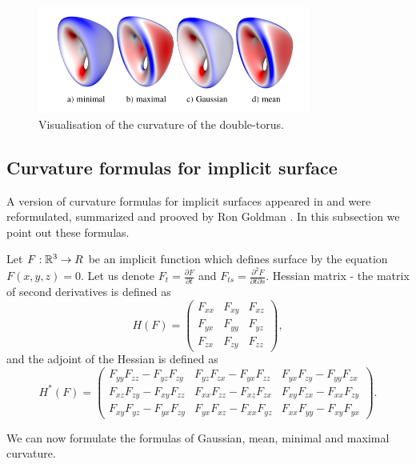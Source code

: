 \begin{figure}
    \centerline{\includegraphics[width=0.8\textwidth]{images/img16}}
    \caption[Visualisation of the curvature of the double-torus]
    {Visualisation of the curvature of the double-torus.}
    \label{img:16}
\end{figure}

\subsection*{Curvature formulas for implicit surface}

A version of curvature formulas for implicit surfaces appeared in \cite{spivak1975comprehensive}
and were reformulated, summarized and prooved by Ron Goldman \cite{goldman2005curvature}.
In this subsection we point out these formulas.

Let $F:\mathbb{R}^3 \to R$ be an implicit function which defines surface by the equation $F(x, y, z) = 0$. 
Let us denote $F_t = \frac{\partial F}{\partial t}$ and $F_{ts} = \frac{\partial^2 F}{\partial t \partial s}$.
Hessian matrix - the matrix of second derivatives is defined as 
$$
H(F) = 
\begin{pmatrix}
    F_{xx} & F_{xy} & F_{xz}\\
    F_{yx} & F_{yy} & F_{yz}\\
    F_{zx} & F_{zy} & F_{zz}
\end{pmatrix},
$$
and the adjoint of the Hessian is defined as
$$
H^*(F) = 
\begin{pmatrix}
    F_{yy} F_{zz} - F_{yz} F_{zy} & F_{yz} F_{zx} - F_{yx} F_{zz} & F_{yx} F_{zy} - F_{yy} F_{zx}\\
    F_{xz} F_{zy} - F_{xy} F_{zz} & F_{xx} F_{zz} - F_{xz} F_{zx} & F_{xy} F_{zx} - F_{xx} F_{zy}\\
    F_{xy} F_{yz} - F_{yx} F_{zy} & F_{yx} F_{xz} - F_{xx} F_{yz} & F_{xx} F_{yy} - F_{xy} F_{yx}
\end{pmatrix}.
$$

We can now formulate the formulas of Gaussian, mean, minimal and maximal curvature.

